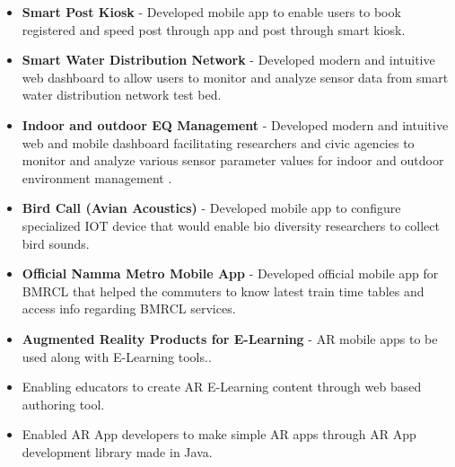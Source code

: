 \documentclass[10pt,a4paper,ragged2e]{altacv}
\begin{document}
\vspace{10px}

\begin{itemize}
    \item \textbf{Smart Post Kiosk} - Developed mobile app to enable users to book registered and speed post through app and post through smart kiosk.
    \item \textbf{Smart Water Distribution Network} - Developed modern and intuitive web dashboard to allow users to monitor and analyze sensor data from smart water distribution network test bed.
    \item \textbf{Indoor and outdoor EQ Management} - Developed modern and intuitive web and mobile dashboard facilitating researchers and civic agencies to monitor and analyze various sensor parameter values for indoor and outdoor environment management .
    \item \textbf{Bird Call (Avian Acoustics)} - Developed mobile app to configure specialized IOT device that would enable bio diversity researchers to collect bird sounds.
    \item \textbf{Official Namma Metro Mobile App} - Developed official mobile app for BMRCL that helped the commuters to know latest train time tables and access info regarding BMRCL services.
\end{itemize}

\vspace{10px}

\begin{itemize}
    \item \textbf{Augmented Reality Products for E-Learning} - AR mobile apps to be used along with E-Learning tools..
    \item Enabling educators to create AR E-Learning content through web based authoring tool.
    \item Enabled AR App developers to make simple AR apps through AR App development library made in Java.
\end{itemize}

\vspace{10px}


\clearpage
\end{document}
